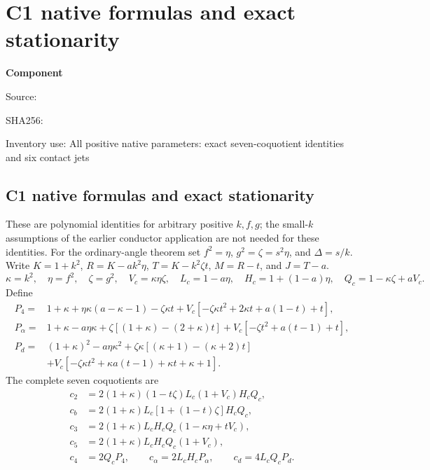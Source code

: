 \chapter{C1 native formulas and exact stationarity}
\label{component:pfecc204a8025}
\noindent\textbf{Component }\par
{\small\noindent Source: \par}
{\small\noindent SHA256: \par}
{\small\noindent Inventory use: All positive native parameters: exact seven-coquotient identities and six contact jets\par}
\medskip
\section{C1 native formulas and exact stationarity}
\label{pfecc204a8025:app:c1-native}
These are polynomial identities for arbitrary positive $k,f,g$;
the small-$k$ assumptions of the earlier conductor application are not
needed for these identities. For the ordinary-angle theorem set
$f^2=\eta$, $g^2=\zeta=s^2\eta$, and $\Delta=s/k$.
Write $K=1+k^2$, $R=K-ak^2\eta$, $T=K-k^2\zeta t$,
$M=R-t$, and $J=T-a$.
\[
 \kappa=k^2,\quad \eta=f^2,\quad \zeta=g^2,
 \quad V_c=\kappa\eta\zeta,\quad
 L_c=1-a\eta,\quad H_c=1+(1-a)\eta,\quad Q_c=1-\kappa\zeta+aV_c.
\]
Define
\begin{align*}
P_4={}&1+\kappa+\eta\kappa(a-\kappa-1)-\zeta\kappa t
 +V_c[-\zeta\kappa t^2+2\kappa t+a(1-t)+t],\\
P_\alpha={}&1+\kappa-a\eta\kappa
 +\zeta[(1+\kappa)-(2+\kappa)t]
 +V_c[-\zeta t^2+a(t-1)+t],\\
P_d={}&(1+\kappa)^2-a\eta\kappa^2
 +\zeta\kappa[(\kappa+1)-(\kappa+2)t]\\
 &+V_c[-\zeta\kappa t^2+\kappa a(t-1)+\kappa t+\kappa+1].
\end{align*}
The complete seven coquotients are
\begin{align*}
c_2&=2(1+\kappa)(1-t\zeta)L_c(1+V_c)H_cQ_c,\\
c_b&=2(1+\kappa)L_c[1+(1-t)\zeta]H_cQ_c,\\
c_3&=2(1+\kappa)L_cH_cQ_c(1-\kappa\eta+tV_c),\\
c_5&=2(1+\kappa)L_cH_cQ_c(1+V_c),\\
c_4&=2Q_cP_4,\qquad c_\alpha=2L_cH_cP_\alpha,
 \qquad c_d=4L_cQ_cP_d.
\end{align*}

